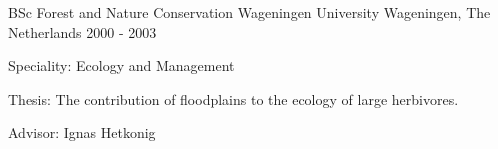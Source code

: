 \begin{cventries}
   \cventry
    {BSc Forest and Nature Conservation} %
    {Wageningen University} %
    {Wageningen, The Netherlands} %
    {2000 - 2003} %
    {
      \begin{cvitems} %
      \item Speciality: Ecology and Management
        \item {Thesis: The contribution of floodplains to the ecology of large herbivores.}
         \item{Advisor: Ignas Hetkonig}
      \end{cvitems}
      }
\end{cventries}
